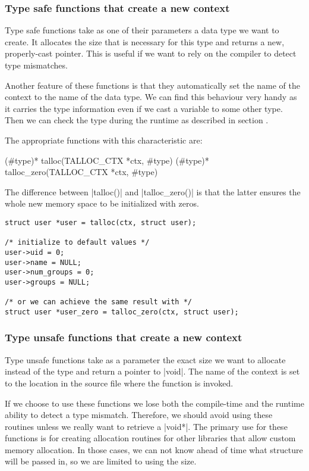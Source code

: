 \subsubsection{Type safe functions that create a new context}

Type safe functions take as one of their parameters a data type we want to
create. It allocates the size that is necessary for this type and returns a
new, properly-cast pointer. This is useful if we want to rely on the compiler
to detect type mismatches.

Another feature of these functions is that they automatically set the name of
the context to the name of the data type. We can find this behaviour very handy
as it carries the type information even if we cast a variable to some other
type. Then we can check the type during the runtime as described in section
.

The appropriate functions with this characteristic are:

\begin{funcproto}
(#type)* talloc(TALLOC_CTX *ctx, #type)
(#type)* talloc_zero(TALLOC_CTX *ctx, #type)
\end{funcproto}
\funclistend
The difference between |talloc()| and |talloc_zero()| is that the latter ensures
the whole new memory space to be initialized with zeros.

\begin{lstlisting}[caption={talloc() and talloc_zero()},label=lst:talloc_zero]
struct user *user = talloc(ctx, struct user);

/* initialize to default values */
user->uid = 0;
user->name = NULL;
user->num_groups = 0;
user->groups = NULL;

/* or we can achieve the same result with */
struct user *user_zero = talloc_zero(ctx, struct user);
\end{lstlisting}

\subsubsection{Type unsafe functions that create a new context}

Type unsafe functions take as a parameter the exact size we want to allocate
instead of the type and return a pointer to |void|. The name of the context
is set to the location in the source file where the function is invoked.

If we choose to use these functions we lose both the compile-time and the
runtime ability to detect a type mismatch. Therefore, we should avoid using
these routines unless we really want to retrieve a |void*|. The primary use for
these functions is for creating allocation routines for other libraries that
allow custom memory allocation. In those cases, we can not know ahead of time
what structure will be passed in, so we are limited to using the size.

